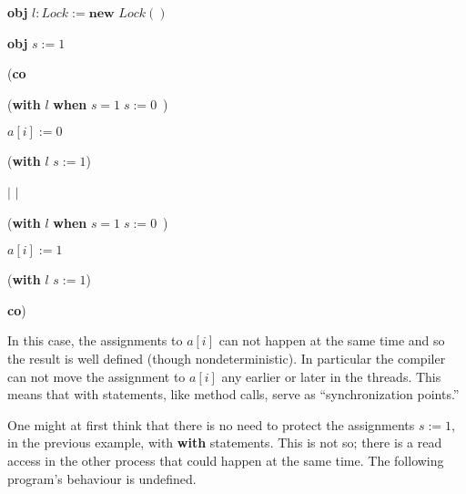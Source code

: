 \documentclass{article}%
\begin{document}
\begin{code}
\textbf{obj} $l:\mathit{Lock}:=\mathbf{new}$ $\mathit{Lock()}$

\textbf{obj} $s:=1$

(\textbf{co}

\begin{indent}
\item (\textbf{with} $l$ \textbf{when} $s=1\;s:=0$\ )

\item $a[i]:=0$

\item (\textbf{with} $l$ $s:=1$)
\end{indent}

%

$\vert$%
$\vert$%


\begin{indent}
\item (\textbf{with} $l$ \textbf{when} $s=1\;s:=0$\ )

\item $a[i]:=1$

\item (\textbf{with} $l$ $s:=1$)
\end{indent}

\textbf{co})
\end{code}

\noindent In this case, the assignments to $a[i]$ can not happen at the same
time and so the result is well defined (though nondeterministic). In
particular the compiler can not move the assignment to $a[i]$ any earlier or
later in the threads. This means that with statements, like method calls,
serve as \textquotedblleft synchronization points.\textquotedblright

One might at first think that there is no need to protect the assignments
$s:=1$, in the previous example, with \textbf{with} statements. This is not
so; there is a read access in the other process that could happen at the same
time. The following program's behaviour is undefined.
\end{document}
